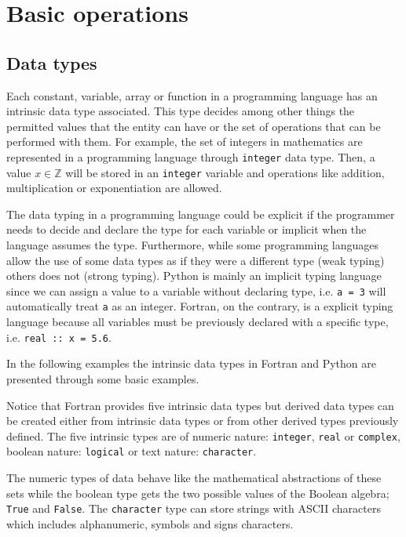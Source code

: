 \chapter{Basic operations} 



\section{Data types} 

Each constant, variable, array or function in a programming language has an intrinsic data type associated. 
This type decides among other things the permitted values that the entity can have or the set of operations that can be performed with them.
For example, the set of integers in mathematics are represented in a programming language through \texttt{integer} data type. 
Then, a value $x\in \mathbb{Z}$ will be stored in an \texttt{integer} variable and operations like addition, multiplication or exponentiation are allowed. 

The data typing in a programming language could be explicit if the programmer needs to decide and declare the type for each variable or implicit when the language assumes the type. 
Furthermore, while some programming languages allow the use of some data types as if they were a different type (weak typing) others does not (strong typing). 
Python is mainly an implicit typing language since we can assign a value to a variable without declaring type, i.e. \texttt{a = 3} will automatically treat \texttt{a} as an integer. 
Fortran, on the contrary, is a explicit typing language because all variables must be previously declared with a specific type, i.e. \texttt{real :: x = 5.6}.

In the following examples the intrinsic data types in Fortran and Python are presented through some basic examples. 

Notice that Fortran provides five intrinsic data types but derived data types can be created either from intrinsic data types or from other derived types previously defined.
The five intrinsic types are of numeric nature: \texttt{integer}, \texttt{real} or \texttt{complex}, boolean nature: \texttt{logical} or text nature: \texttt{character}.

The numeric types of data behave like the mathematical abstractions of these sets while the boolean type gets the two possible values of the Boolean algebra; \texttt{True} and \texttt{False}. 
The \texttt{character} type can store strings with ASCII characters which includes alphanumeric, symbols and signs characters.   

